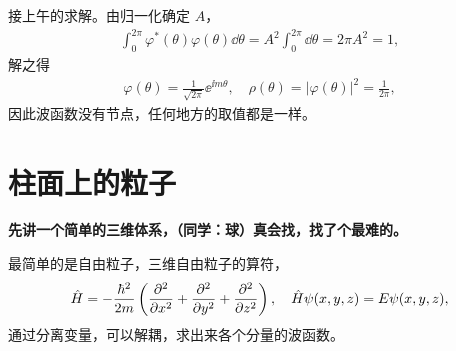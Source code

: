 接上午的求解。由归一化确定 $A$，
\begin{align}
    \int_0^{2\pi} \varphi^*(\theta) \varphi(\theta) \dd\theta = A^2 \int_{0}^{2\pi} \dd\theta = 2\pi A^2 = 1,
\end{align}
解之得
\begin{align}
    \varphi(\theta) = \frac{1}{\sqrt{2\pi}} \ee^{\ii m \theta}, \quad \rho(\theta) = |\varphi(\theta)|^2 = \frac1{2\pi},
\end{align}
因此波函数没有节点，任何地方的取值都是一样。



\section{柱面上的粒子}
\textbf{先讲一个简单的三维体系，（同学：球）真会找，找了个最难的。}

最简单的是自由粒子，三维自由粒子的算符，
\begin{align}
    \hat H = -\frac{\hbar^2}{2m} \left(\pdv[2]{x} + \pdv[2]{y} + \pdv[2]{z}\right), \quad \hat H \psi(x,y,z) = E \psi (x,y,z),
\end{align}
通过分离变量，可以解耦，求出来各个分量的波函数。

